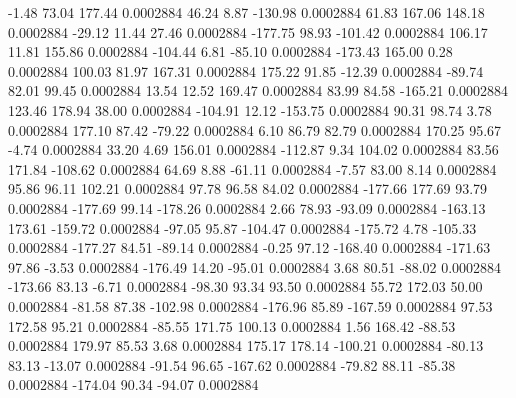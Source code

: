        -1.48       73.04      177.44     0.0002884
       46.24        8.87     -130.98     0.0002884
       61.83      167.06      148.18     0.0002884
      -29.12       11.44       27.46     0.0002884
     -177.75       98.93     -101.42     0.0002884
      106.17       11.81      155.86     0.0002884
     -104.44        6.81      -85.10     0.0002884
     -173.43      165.00        0.28     0.0002884
      100.03       81.97      167.31     0.0002884
      175.22       91.85      -12.39     0.0002884
      -89.74       82.01       99.45     0.0002884
       13.54       12.52      169.47     0.0002884
       83.99       84.58     -165.21     0.0002884
      123.46      178.94       38.00     0.0002884
     -104.91       12.12     -153.75     0.0002884
       90.31       98.74        3.78     0.0002884
      177.10       87.42      -79.22     0.0002884
        6.10       86.79       82.79     0.0002884
      170.25       95.67       -4.74     0.0002884
       33.20        4.69      156.01     0.0002884
     -112.87        9.34      104.02     0.0002884
       83.56      171.84     -108.62     0.0002884
       64.69        8.88      -61.11     0.0002884
       -7.57       83.00        8.14     0.0002884
       95.86       96.11      102.21     0.0002884
       97.78       96.58       84.02     0.0002884
     -177.66      177.69       93.79     0.0002884
     -177.69       99.14     -178.26     0.0002884
        2.66       78.93      -93.09     0.0002884
     -163.13      173.61     -159.72     0.0002884
      -97.05       95.87     -104.47     0.0002884
     -175.72        4.78     -105.33     0.0002884
     -177.27       84.51      -89.14     0.0002884
       -0.25       97.12     -168.40     0.0002884
     -171.63       97.86       -3.53     0.0002884
     -176.49       14.20      -95.01     0.0002884
        3.68       80.51      -88.02     0.0002884
     -173.66       83.13       -6.71     0.0002884
      -98.30       93.34       93.50     0.0002884
       55.72      172.03       50.00     0.0002884
      -81.58       87.38     -102.98     0.0002884
     -176.96       85.89     -167.59     0.0002884
       97.53      172.58       95.21     0.0002884
      -85.55      171.75      100.13     0.0002884
        1.56      168.42      -88.53     0.0002884
      179.97       85.53        3.68     0.0002884
      175.17      178.14     -100.21     0.0002884
      -80.13       83.13      -13.07     0.0002884
      -91.54       96.65     -167.62     0.0002884
      -79.82       88.11      -85.38     0.0002884
     -174.04       90.34      -94.07     0.0002884
